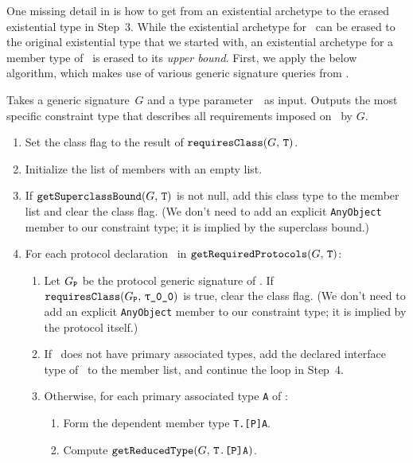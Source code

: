 \documentclass[../generics]{subfiles}
\begin{document}
One missing detail in  is how to get from an existential archetype to the erased existential type in Step~3. While the existential archetype for \tSelf\ can be erased to the original existential type that we started with, an existential archetype for a member type of \tSelf\ is erased to its \emph{upper bound}. First, we apply the below algorithm, which makes use of various generic signature queries from .

\begin{algorithm}\label{alg:upper bound}
Takes a generic signature~$G$ and a type parameter~\tT\ as input. Outputs the most specific constraint type that describes all requirements imposed on \tT\ by $G$.
\begin{enumerate}
\item Set the class flag to the result of $\texttt{requiresClass}(G,\,\texttt{T})$.
\item Initialize the list of members with an empty list.
\item If $\texttt{getSuperclassBound}(G,\,\texttt{T})$ is not null, add this class type to the member list and clear the class flag. (We don't need to add an explicit \texttt{AnyObject} member to our constraint type; it is implied by the superclass bound.)
\item For each protocol declaration \tP\ in $\texttt{getRequiredProtocols}(G,\,\texttt{T})$:
\begin{enumerate}
\item Let $G_{\texttt{P}}$ be the protocol generic signature of \tP. If $\Query{requiresClass}{\GP,\,\rT}$ is true, clear the class flag. (We don't need to add an explicit \texttt{AnyObject} member to our constraint type; it is implied by the protocol itself.)
\item If \tP\ does not have primary associated types, add the declared interface type of \tP\ to the member list, and continue the loop in Step~4.
\item Otherwise, for each primary associated type \texttt{A} of \tP:
\begin{enumerate}
\item Form the dependent member type \texttt{T.[P]A}.
\item Compute $\texttt{getReducedType}(G,\, \texttt{T.[P]A})$.

\end{enumerate}
\end{enumerate}
\end{enumerate}
\end{algorithm}
\end{document}
